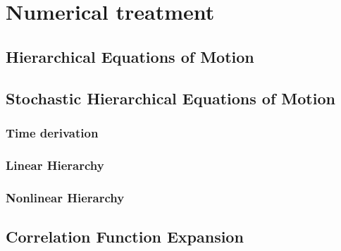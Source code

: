 \chapter{Numerical treatment}
\label{chap:num}


\section{Hierarchical Equations of Motion}
\label{sec:num.heom}


\section{Stochastic Hierarchical Equations of Motion}
\label{sec:num.sheom}

\subsection{Time derivation}
\label{sub:num.sheom.time_deriv}

\subsection{Linear Hierarchy}
\label{sub:num.sheom.lin}

\subsection{Nonlinear Hierarchy}
\label{sub:num.sheom.nonlin}


\section{Correlation Function Expansion}
\label{sec:num.expansion}


